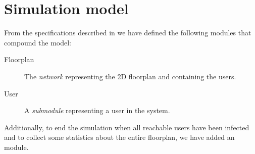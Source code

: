 \chapter{Simulation model}\label{ch:model}

From the specifications described in  we have defined the
following modules that compound the model:
\begin{description}
	\item[Floorplan] The \emph{network} representing the 2D floorplan and
		containing the users.
	\item[User] A \emph{submodule} representing a user in the system.
\end{description}

Additionally, to end the simulation when all reachable users have been infected
and to collect some statistics about the entire floorplan, we have added an
 module.





